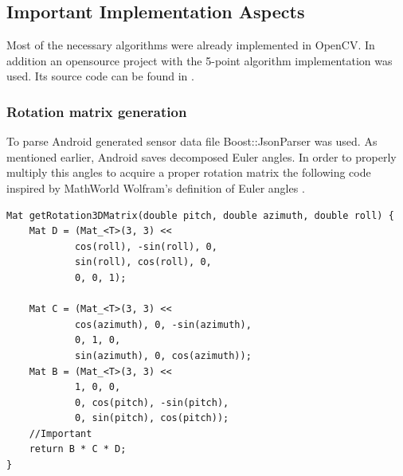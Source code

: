 \subsection{Important Implementation Aspects}
Most of the necessary algorithms were already implemented in OpenCV. In addition an opensource project with the 5-point algorithm implementation was used. Its source code can be found in \cite{website:relativePoseLibrary}.
\subsubsection{Rotation matrix generation}
To parse Android generated sensor data file Boost::JsonParser was used. As mentioned earlier, Android saves decomposed Euler angles. In order to properly multiply this angles to acquire a proper rotation matrix the following code inspired by MathWorld Wolfram's definition of Euler angles \cite{website:eulerAngles}.
\begin{lstlisting}
Mat getRotation3DMatrix(double pitch, double azimuth, double roll) {
    Mat D = (Mat_<T>(3, 3) <<
            cos(roll), -sin(roll), 0,
            sin(roll), cos(roll), 0,
            0, 0, 1);

    Mat C = (Mat_<T>(3, 3) <<
            cos(azimuth), 0, -sin(azimuth),
            0, 1, 0,
            sin(azimuth), 0, cos(azimuth));
    Mat B = (Mat_<T>(3, 3) <<
            1, 0, 0,
            0, cos(pitch), -sin(pitch),
            0, sin(pitch), cos(pitch));
    //Important
    return B * C * D;
}
\end{lstlisting}
